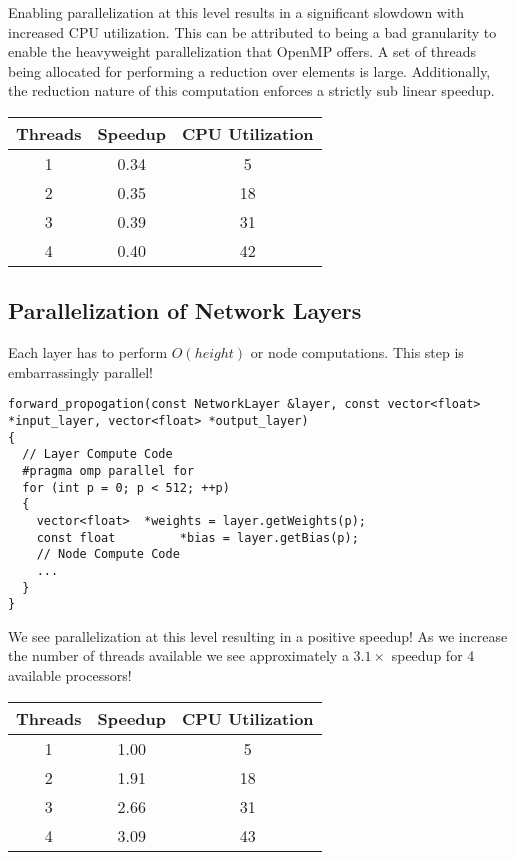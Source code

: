 Enabling parallelization at this level results in a significant slowdown with increased CPU utilization.
This can be attributed to being a bad granularity to enable the heavyweight parallelization that OpenMP offers.
A set of threads being allocated for performing a reduction over \netheight elements is large.
Additionally, the reduction nature of this computation enforces a strictly sub linear speedup.

\begin{center}
\begin{tabular}{|c|c|c|}
  \hline
  Threads & Speedup & CPU Utilization \\ \hline
  1 & 0.34 & 5 \\
  2 & 0.35 & 18 \\
  3 & 0.39 & 31 \\
  4 & 0.40 & 42 \\
  \hline
\end{tabular}
\end{center}


\subsection*{Parallelization of Network Layers}
Each layer has to perform $O(height)$ or \netheight node computations.
This step is embarrassingly parallel!

\begin{lstlisting}
forward_propogation(const NetworkLayer &layer, const vector<float> *input_layer, vector<float> *output_layer)
{
  // Layer Compute Code
  #pragma omp parallel for
  for (int p = 0; p < 512; ++p)
  {
    vector<float>  *weights = layer.getWeights(p);
    const float         *bias = layer.getBias(p);
    // Node Compute Code
    ...
  }
}
\end{lstlisting}

We see parallelization at this level resulting in a positive speedup!
As we increase the number of threads available we see approximately a $3.1 \times$ speedup for 4 available processors!

\begin{center}
\begin{tabular}{|c|c|c|}
  \hline
  Threads & Speedup & CPU Utilization \\ \hline
  1 & 1.00 & 5 \\
  2 & 1.91 & 18 \\
  3 & 2.66 & 31 \\
  4 & 3.09 & 43 \\
  \hline
\end{tabular}
\end{center}

